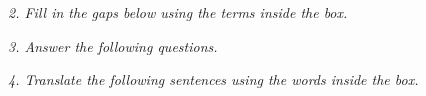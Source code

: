 \documentclass{exam}
\begin{document}
\noindent \textit{2. Fill in the gaps below using the terms inside the box.}

%
%
%
%
%
%
%
%
%
%
%
%
%
%
%
%
%
%
%
%

\noindent \textit{3. Answer the following questions.}
%
%
%
%
%
%
%
%
%
%
%
%
%
%
%
%
%
%
%
%



\noindent \textit{4. Translate the following sentences using the words inside the box.}

\begin{CJK*}{UTF8}{gbsn}
%
%
%
%
%
%
%
%
%
%
%
%
%
%
%
%
%
%
%
%
\end{CJK*}
\end{document}
